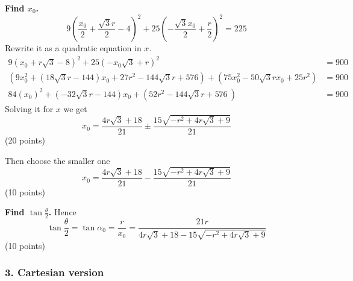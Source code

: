 \begin{description}
  \textbf{Find $x_0$.}
  \[
    9\left(\frac{x_0}{2} + \frac{\sqrt{3}r}{2} - 4\right)^2
      + 25\left(-\frac{\sqrt{3}x_0}{2} + \frac{r}{2}\right)^2 = 225
  \]
  Rewrite it as a quadratic equation in $x$.
  \begin{align*}
    9\left(x_0 + r\sqrt{3} - 8\right)^2
      + 25\left(-x_0\sqrt{3} + r\right)^2 &= 900 \\
    \left(9x_0^2 + \left(18\sqrt{3}r - 144\right)x_0 + 27r^2
      - 144\sqrt{3}r + 576\right)
      + \left(75x_0^2 - 50\sqrt{3}rx_0 + 25r^2\right) &= 900 \\
    84(x_0)^2 + \left(-32\sqrt{3}r - 144\right)x_0
      + \left(52r^2 - 144\sqrt{3}r + 576\ \right) &= 900
  \end{align*}
  Solving it for $x$ we get
  \[
    x_0 = \frac{4r\sqrt{3} + 18}{21}
      \pm \frac{15\sqrt{-r^2 + 4r\sqrt{3} + 9}}{21}
  \]
  \hfill(20 points)

  Then choose the smaller one
  \[
    x_0 = \frac{4r\sqrt{3} + 18}{21}
      - \frac{15\sqrt{-r^2 + 4r\sqrt{3} + 9}}{21}
  \]
  \hfill(10 points)

  \textbf{Find $\tan\frac{\theta}{2}$.} Hence
  \[
    \tan\frac{\theta}{2} = \tan\alpha_0 = \frac{r}{x_0}
      = \frac{21r}{4r\sqrt{3} + 18 - 15\sqrt{-r^2 + 4r\sqrt{3} + 9}}
  \]
  \hfill(10 points)
\end{description}

\subsubsection*{3. Cartesian version} %

